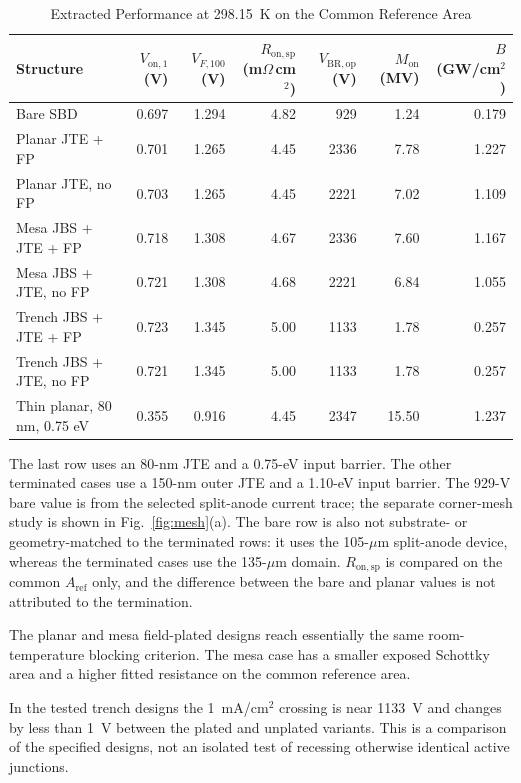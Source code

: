 \documentclass[journal,10pt]{IEEEtran}
\newcommand{\Vop}{\ensuremath{V_{\mathrm{BR,op}}}}
\newcommand{\Von}{\ensuremath{V_{\mathrm{on},1}}}
\newcommand{\Ron}{\ensuremath{R_{\mathrm{on,sp}}}}
\begin{document}
\begin{table}[!t]
\caption{Extracted Performance at 298.15~K on the Common Reference Area}
\label{tab:architectures}
\centering\footnotesize
\begin{tabular}{lrrrrrr}
\toprule
Structure & $\Von$ (V) & $V_{F,100}$ (V) & $\Ron$ (m$\Omega$\,cm$^2$) & $\Vop$ (V) & $M_{\mathrm{on}}$ (MV) & $B$ (GW/cm$^2$)\\
\midrule
Bare SBD & 0.697 & 1.294 & 4.82 & 929 & 1.24 & 0.179\\
Planar JTE + FP & 0.701 & 1.265 & 4.45 & 2336 & 7.78 & 1.227\\
Planar JTE, no FP & 0.703 & 1.265 & 4.45 & 2221 & 7.02 & 1.109\\
Mesa JBS + JTE + FP & 0.718 & 1.308 & 4.67 & 2336 & 7.60 & 1.167\\
Mesa JBS + JTE, no FP & 0.721 & 1.308 & 4.68 & 2221 & 6.84 & 1.055\\
Trench JBS + JTE + FP & 0.723 & 1.345 & 5.00 & 1133 & 1.78 & 0.257\\
Trench JBS + JTE, no FP & 0.721 & 1.345 & 5.00 & 1133 & 1.78 & 0.257\\
Thin planar, 80 nm, 0.75 eV & 0.355 & 0.916 & 4.45 & 2347 & 15.50 & 1.237\\
\bottomrule
\end{tabular}
\par\smallskip\begin{minipage}{0.96\textwidth}\footnotesize
The last row uses an 80-nm JTE and a 0.75-eV input barrier. The other terminated cases use a 150-nm outer JTE and a 1.10-eV input barrier. The 929-V bare value is from the selected split-anode current trace; the separate corner-mesh study is shown in Fig.~\ref{fig:mesh}(a). The bare row is also not substrate- or geometry-matched to the terminated rows: it uses the 105-$\mu$m split-anode device, whereas the terminated cases use the 135-$\mu$m domain. $R_{\mathrm{on,sp}}$ is compared on the common $A_{\mathrm{ref}}$ only, and the difference between the bare and planar values is not attributed to the termination.
\end{minipage}
\end{table}

The planar and mesa field-plated designs reach essentially the same room-temperature blocking criterion. The mesa case has a smaller exposed Schottky area and a higher fitted resistance on the common reference area.

In the tested trench designs the 1~mA/cm$^2$ crossing is near 1133~V and changes by less than 1~V between the plated and unplated variants. This is a comparison of the specified designs, not an isolated test of recessing otherwise identical active junctions.
\end{document}
